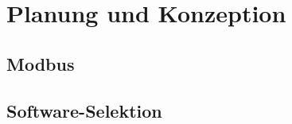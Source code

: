 \ifoot{\schneider}
\chapter{Planung und Konzeption}

\section{Modbus}


\newpage
\ifoot{\schneider}
\section{Software-Selektion}


